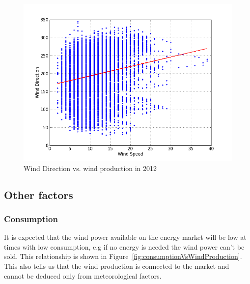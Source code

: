 \begin{figure}[H]
\centering
\includegraphics[width=0.99\linewidth,natwidth=898,natheight=587]{billeder/windDirectionVersusWindSpeed.png}
\caption{Wind Direction vs. wind production in 2012}
\label{fig:windDirectionVersusWindSpeed}
\end{figure}

\subsection{Other factors}

\subsubsection{Consumption}
It is expected that the wind power available on the energy market will be low at times with low consumption, e.g if no energy is needed the wind power can't be sold.  This relationship is shown in Figure~\ref{fig:consumptionVsWindProduction}. This also tells us that the wind production is connected to the market and cannot be deduced only from meteorological factors.

